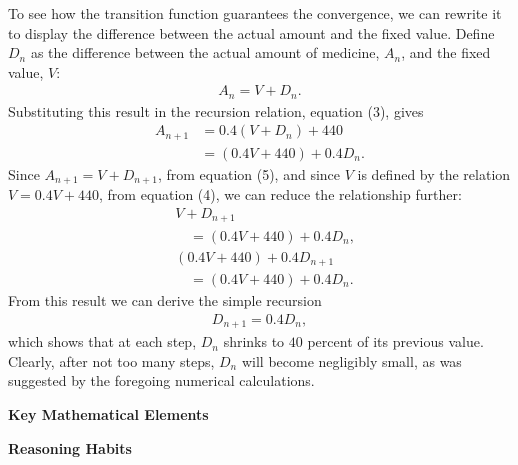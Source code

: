 {\begin{description}
      To see how the transition function guarantees the convergence, we can rewrite it to display the difference between the actual amount and the fixed value. Define $D_n$ as the difference between the actual amount of medicine, $A_n$, and the fixed value, $V$:
        \begin{align*}
          A_n=V+D_n. \tag{5}
        \end{align*}
      Substituting this result in the recursion relation, equation (3), gives
      \begin{align*}
        A_{n+1}
          &=0.4(V+D_n)+440\\
          &=(0.4V+440)+0.4D_n. \tag{6}
      \end{align*}
      Since $A_{n+1} = V + D_{n+1}$, from equation (5), and since $V$ is defined by the relation $V = 0.4V + 440$, from equation (4), we can reduce the relationship further:
      \begin{align*}
        &V+D_{n+1} \\
        &\quad =(0.4V+440)+0.4D_n, \\
        & (0.4V+440)+0.4D_{n+1} \\
        &\quad =(0.4V+440)+0.4D_n.
      \end{align*}
      From this result we can derive the simple recursion
        \begin{align*}
          D_{n+1}=0.4D_n, \tag{7}
        \end{align*}
      which shows that at each step, $D_n$ shrinks to $40$ percent of its previous value. Clearly, after not too many steps, $D_n$ will become negligibly small, as was suggested by the foregoing numerical calculations.
    \end{description}\vspace{.5\baselineskip}

    \textbf{Key Mathematical Elements}

    \begin{hanglist}
    \end{hanglist}

    \textbf{Reasoning Habits}

    \begin{hanglist}
    \end{hanglist}
  }
